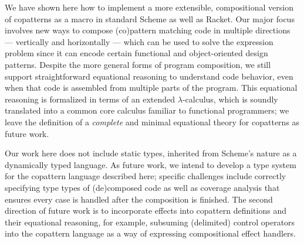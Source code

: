 We have shown here how to implement a more extensible, compositional version of copatterns as a macro in standard Scheme as well as Racket.
Our major focus involves new ways to compose (co)pattern matching code in multiple directions --- vertically and horizontally --- which can be used to solve the expression problem since it can encode certain functional and object-oriented design patterns.
Despite the more general forms of program composition, we still support straightforward equational reasoning to understand code behavior, even when that code is assembled from multiple parts of the program.
This equational reasoning is formalized in terms of an extended $\lambda$-calculus, which is soundly translated into a common core calculus familiar to functional programmers;
we leave the definition of a \emph{complete} and minimal equational theory for copatterns as future work.

Our work here does not include static types, inherited from Scheme's nature as a dynamically typed language.
As future work, we intend to develop a type system for the copattern language described here; specific challenges include correctly specifying type types of (de)composed code as well as coverage analysis that ensures every case is handled after the composition is finished.
The second direction of future work is to incorporate effects into copattern definitions and their equational reasoning, for example, subsuming (delimited) control operators into the copattern language as a way of expressing compositional effect handlers.


